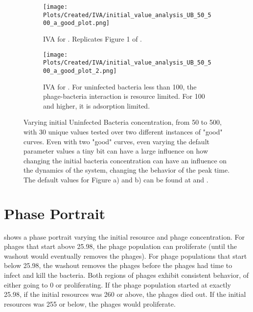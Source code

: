 \begin{figure}
    \centering
    \begin{subfigure}{1\linewidth}
        \centering
        \texttt{[image: Plots/Created/IVA/initial\_value\_analysis\_UB\_50\_500\_a\_good\_plot.png]}
        \caption{
            IVA for . 
            Replicates Figure 1 of \citet{mullaExtremeDiversityPhage2024}. 
        }
        \label{fig:created:initial_value_analysis_UB_50_500_a_good_plot}
    \end{subfigure}
    \hfill
    \begin{subfigure}{1\linewidth}
        \centering
        \texttt{[image: Plots/Created/IVA/initial\_value\_analysis\_UB\_50\_500\_a\_good\_plot\_2.png]}
        \caption{
            IVA for . 
            For uninfected bacteria less than 100, the phage-bacteria interaction is resource limited. 
            For 100 and higher, it is adsorption limited. 
        }
        \label{fig:created:initial_value_analysis_UB_50_500_a_good_plot_2}
    \end{subfigure}
    \caption{
        Varying initial Uninfected Bacteria concentration, from 50 to 500, with 30 unique values tested over two different instances of "good" curves. 
        Even with two "good" curves, even varying the default parameter values a tiny bit can have a large influence on how changing the initial bacteria concentration can have an influence on the dynamics of the system, changing the behavior of the peak time. 
        The default values for Figure a) and b) can be found at  and . 
    }
\end{figure}


\section{Phase Portrait}
\label{sec:results:phase_portrait}
 shows a phase portrait varying the initial resource and phage concentration. 
For phages that start above 25.98, the phage population can proliferate (until the washout would eventually removes the phages). 
For phage populations that start below 25.98, the washout removes the phages before the phages had time to infect and kill the bacteria. 
Both regions of phages exhibit consistent behavior, of either going to 0 or proliferating. 
If the phage population started at exactly 25.98, if the initial resources was 260 or above, the phages died out. 
If the initial resources was 255 or below, the phages would proliferate. 

